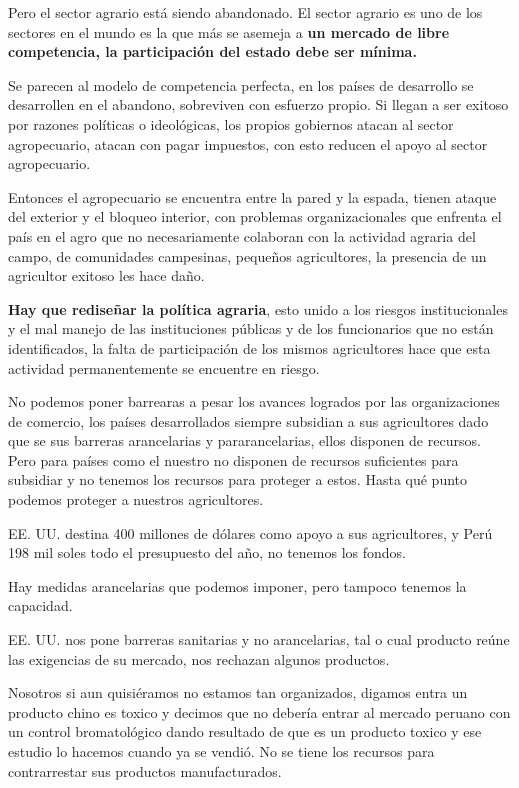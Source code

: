 \documentclass[
  a4paper,
]{article}
\begin{document}
Pero el sector agrario está siendo abandonado. El sector agrario es uno
de los sectores en el mundo es la que más se asemeja a \textbf{un
mercado de libre competencia, la participación del estado debe ser
mínima.}

Se parecen al modelo de competencia perfecta, en los países de
desarrollo se desarrollen en el abandono, sobreviven con esfuerzo
propio. Si llegan a ser exitoso por razones políticas o ideológicas, los
propios gobiernos atacan al sector agropecuario, atacan con pagar
impuestos, con esto reducen el apoyo al sector agropecuario.

Entonces el agropecuario se encuentra entre la pared y la espada, tienen
ataque del exterior y el bloqueo interior, con problemas
organizacionales que enfrenta el país en el agro que no necesariamente
colaboran con la actividad agraria del campo, de comunidades campesinas,
pequeños agricultores, la presencia de un agricultor exitoso les hace
daño.

\textbf{Hay que rediseñar la política agraria}, esto unido a los riesgos
institucionales y el mal manejo de las instituciones públicas y de los
funcionarios que no están identificados, la falta de participación de
los mismos agricultores hace que esta actividad permanentemente se
encuentre en riesgo.

No podemos poner barrearas a pesar los avances logrados por las
organizaciones de comercio, los países desarrollados siempre subsidian a
sus agricultores dado que se sus barreras arancelarias y
pararancelarias, ellos disponen de recursos. Pero para países como el
nuestro no disponen de recursos suficientes para subsidiar y no tenemos
los recursos para proteger a estos. Hasta qué punto podemos proteger a
nuestros agricultores.

EE. UU. destina 400 millones de dólares como apoyo a sus agricultores, y
Perú 198 mil soles todo el presupuesto del año, no tenemos los fondos.

Hay medidas arancelarias que podemos imponer, pero tampoco tenemos la
capacidad.

EE. UU. nos pone barreras sanitarias y no arancelarias, tal o cual
producto reúne las exigencias de su mercado, nos rechazan algunos
productos.

Nosotros si aun quisiéramos no estamos tan organizados, digamos entra un
producto chino es toxico y decimos que no debería entrar al mercado
peruano con un control bromatológico dando resultado de que es un
producto toxico y ese estudio lo hacemos cuando ya se vendió. No se
tiene los recursos para contrarrestar sus productos manufacturados.
\end{document}
